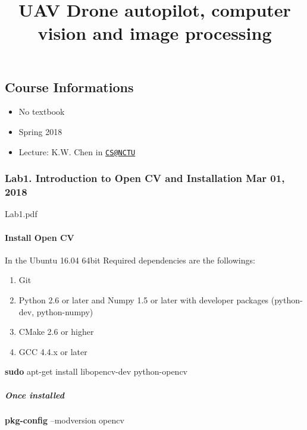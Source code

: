\documentclass[]{article}
\title{UAV Drone autopilot, computer vision and image processing}
\author{}
\date{}
\newenvironment{Shaded}{\begin{snugshade}}{\end{snugshade}}
\newcommand{\KeywordTok}[1]{\textcolor[rgb]{0.13,0.29,0.53}{\textbf{{#1}}}}
\newcommand{\NormalTok}[1]{{#1}}
\providecommand{\tightlist}{%
  \setlength{\itemsep}{0pt}\setlength{\parskip}{0pt}}
\let\oldparagraph\paragraph
\renewcommand{\paragraph}[1]{\oldparagraph{#1}\mbox{}}
\let\oldsubparagraph\subparagraph
\renewcommand{\subparagraph}[1]{\oldsubparagraph{#1}\mbox{}}
\begin{document}
\maketitle

\subsection{Course Informations}\label{course-informations}

\begin{itemize}
\tightlist
\item
  No textbook
\item
  Spring 2018
\item
  Lecture: K.W. Chen in \href{mailto:CS@NCTU}{\nolinkurl{CS@NCTU}}
\end{itemize}

\subsubsection{Lab1. Introduction to Open CV and Installation Mar 01,
2018}\label{lab1.-introduction-to-open-cv-and-installation-mar-01-2018}

Lab1.pdf

\paragraph{Install Open CV}\label{install-open-cv}

In the Ubuntu 16.04 64bit Required dependencies are the followings:

\begin{enumerate}
\def\labelenumi{\arabic{enumi}.}
\tightlist
\item
  Git
\item
  Python 2.6 or later and Numpy 1.5 or later with developer packages
  (python-dev, python-numpy)
\item
  CMake 2.6 or higher
\item
  GCC 4.4.x or later
\end{enumerate}

\begin{Shaded}
\begin{Highlighting}[]
\KeywordTok{sudo} \NormalTok{apt-get install libopencv-dev python-opencv}
\end{Highlighting}
\end{Shaded}

\subparagraph{Once installed}\label{once-installed}

\begin{Shaded}
\begin{Highlighting}[]
\KeywordTok{pkg-config} \NormalTok{--modversion opencv}
\end{Highlighting}
\end{Shaded}
\end{document}

